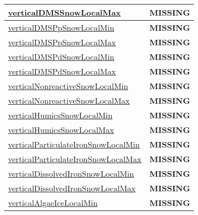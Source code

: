 {\begin{center}
\begin{longtable}{| p{2.0in} | p{4.0in} |}
    \hyperref[subsec:var_sec_tracer_monotonicity_verticalDMSSnowLocalMax]{verticalDMSSnowLocalMax} & {\bf \color{red} MISSING} \\
    \hline
    \hyperref[subsec:var_sec_tracer_monotonicity_verticalDMSPpSnowLocalMin]{verticalDMSPpSnowLocalMin} & {\bf \color{red} MISSING} \\
    \hline
    \hyperref[subsec:var_sec_tracer_monotonicity_verticalDMSPpSnowLocalMax]{verticalDMSPpSnowLocalMax} & {\bf \color{red} MISSING} \\
    \hline
    \hyperref[subsec:var_sec_tracer_monotonicity_verticalDMSPdSnowLocalMin]{verticalDMSPdSnowLocalMin} & {\bf \color{red} MISSING} \\
    \hline
    \hyperref[subsec:var_sec_tracer_monotonicity_verticalDMSPdSnowLocalMax]{verticalDMSPdSnowLocalMax} & {\bf \color{red} MISSING} \\
    \hline
    \hyperref[subsec:var_sec_tracer_monotonicity_verticalNonreactiveSnowLocalMin]{verticalNonreactiveSnowLocalMin} & {\bf \color{red} MISSING} \\
    \hline
    \hyperref[subsec:var_sec_tracer_monotonicity_verticalNonreactiveSnowLocalMax]{verticalNonreactiveSnowLocal\-Max} & {\bf \color{red} MISSING} \\
    \hline
    \hyperref[subsec:var_sec_tracer_monotonicity_verticalHumicsSnowLocalMin]{verticalHumicsSnowLocalMin} & {\bf \color{red} MISSING} \\
    \hline
    \hyperref[subsec:var_sec_tracer_monotonicity_verticalHumicsSnowLocalMax]{verticalHumicsSnowLocalMax} & {\bf \color{red} MISSING} \\
    \hline
    \hyperref[subsec:var_sec_tracer_monotonicity_verticalParticulateIronSnowLocalMin]{verticalParticulateIronSnowLocal\-Min} & {\bf \color{red} MISSING} \\
    \hline
    \hyperref[subsec:var_sec_tracer_monotonicity_verticalParticulateIronSnowLocalMax]{verticalParticulateIronSnowLocal\-Max} & {\bf \color{red} MISSING} \\
    \hline
    \hyperref[subsec:var_sec_tracer_monotonicity_verticalDissolvedIronSnowLocalMin]{verticalDissolvedIronSnowLocal\-Min} & {\bf \color{red} MISSING} \\
    \hline
    \hyperref[subsec:var_sec_tracer_monotonicity_verticalDissolvedIronSnowLocalMax]{verticalDissolvedIronSnowLocal\-Max} & {\bf \color{red} MISSING} \\
    \hline
    \hyperref[subsec:var_sec_tracer_monotonicity_verticalAlgaeIceLocalMin]{verticalAlgaeIceLocalMin} & {\bf \color{red} MISSING} \\

\end{longtable}
\end{center}}
